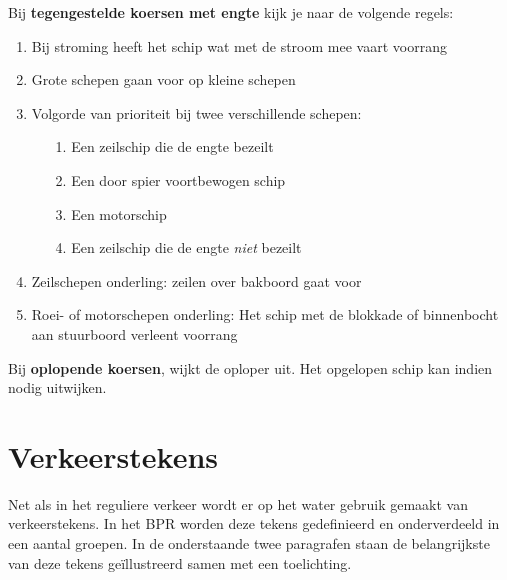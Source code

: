 Bij \textbf{tegengestelde koersen met engte} kijk je naar de volgende regels:
\vspace*{-0.15cm}
\begin{enumerate}
	\item Bij stroming heeft het schip wat met de stroom mee vaart voorrang
	\item Grote schepen gaan voor op kleine schepen
	\item Volgorde van prioriteit bij twee verschillende schepen:
	        \begin{enumerate}
					\item [1.] Een zeilschip die de engte bezeilt
					\item [2.] Een door spier voortbewogen schip
					\item [3.] Een motorschip
					\item [4.] Een zeilschip die de engte \textit{niet} bezeilt
					\end{enumerate}
	\item Zeilschepen onderling: zeilen over bakboord gaat voor 
	\item Roei- of motorschepen onderling: Het schip met de blokkade of binnenbocht aan stuurboord verleent voorrang

\end{enumerate}

Bij \textbf{oplopende koersen}, wijkt de oploper uit. Het opgelopen schip kan indien nodig uitwijken.

\section{Verkeerstekens}
Net als in het reguliere verkeer wordt er op het water gebruik gemaakt van verkeerstekens. In het BPR worden deze tekens gedefinieerd en onderverdeeld in een aantal groepen. In de onderstaande twee paragrafen staan de belangrijkste van deze tekens geïllustreerd samen met een toelichting.

